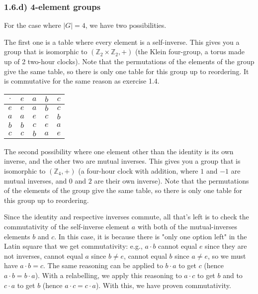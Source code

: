 \documentclass[12pt, letterpaper, twoside]{report}
\begin{document}
\subsubsection*{1.6.d) 4-element groups}

For the case where $|G| = 4$, we have two possibilities.

The first one is a table where every element is a self-inverse. This gives you a group that is isomorphic to $(\mathbb{Z}_2 \times \mathbb{Z}_2, +)$ (the Klein four-group, a torus made up of 2 two-hour clocks). Note that the permutations of the elements of the group give the same table, so there is only one table for this group up to reordering. It is commutative for the same reason as exercise 1.4.

\begin{tabular}{|c||c|c|c|c|}
\hline
$\cdot$ & $e$ & $a$ & $b$ & $c$ \\ \hline \hline
$e    $ & $e$ & $a$ & $b$ & $c$ \\ \hline
$a    $ & $a$ & $e$ & $c$ & $b$ \\ \hline
$b    $ & $b$ & $c$ & $e$ & $a$ \\ \hline
$c    $ & $c$ & $b$ & $a$ & $e$ \\ \hline
\end{tabular}

The second possibility where one element other than the identity is its own inverse, and the other two are mutual inverses. This gives you a group that is isomorphic to $(\mathbb{Z}_4, +)$ (a four-hour clock with addition, where $1$ and $-1$ are mutual inverses, and $0$ and $2$ are their own inverse). Note that the permutations of the elements of the group give the same table, so there is only one table for this group up to reordering.

Since the identity and respective inverses commute, all that's left is to check the commutativity of the self-inverse element $a$ with both of the mutual-inverses elements $b$ and $c$. In this case, it is because there is "only one option left" in the Latin square that we get commutativity: e.g., $a \cdot b$ cannot equal $e$ since they are not inverses, cannot equal $a$ since $b \ne e$, cannot equal $b$ since $a \ne e$, so we must have $a \cdot b = c$. The same reasoning can be applied to $b \cdot a$ to get $c$ (hence $a \cdot b = b \cdot a$). With a relabelling, we apply this reasoning to $a \cdot c$ to get $b$ and to $c \cdot a$ to get $b$ (hence $a \cdot c = c \cdot a$). With this, we have proven commutativity.
\end{document}
